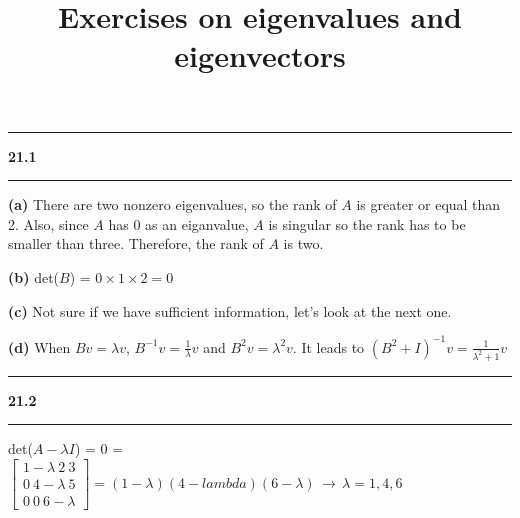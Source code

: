 \documentclass[11pt]{article}
\newcommand\question[2]{\vspace{.25in}\hrule\textbf{#1 #2}\vspace{.5em}\hrule\vspace{.10in}}
\renewcommand\part[1]{\vspace{.10in}\textbf{(#1)}}
\begin{document}
\raggedright
\newcommand\NAME{Haiying Cui}  %
\newcommand\ANDREWID{Christy}     %
\newcommand\HWNUM{21}              %

\title{Exercises on eigenvalues and eigenvectors}
\maketitle

\question{21.1}{}
\part{a} There are two nonzero eigenvalues, so the rank of \(A\) is greater or equal than 2. Also, since \(A\) has 0 as an eiganvalue, \(A\) is singular so the rank has to be smaller than three. Therefore, the rank of \(A\) is two.

\part{b} det(\(B\)) = \(0 \times 1 \times 2 = 0\)

\part{c} Not sure if we have sufficient information, let's look at the next one.

\part{d} When \(Bv = \lambda v\), \(B^{-1}v = \frac{1}{\lambda}v\) and \(B^2v = \lambda^2v\). It leads to \((B^2 + I)^{-1}v = \frac{1}{\lambda^2 + 1}v\)

\question{21.2}{}
det(\(A-\lambda I \)) = 0 = \(\begin{bmatrix} 1 - \lambda \ 2 \ 3 \\ 0 \ 4- \lambda \ 5 \\ 0 \ 0 \ 6- \lambda \end{bmatrix} = (1-\lambda)(4-lambda)(6-\lambda)\,\to\, \lambda = 1, 4, 6 \)
\end{document}
